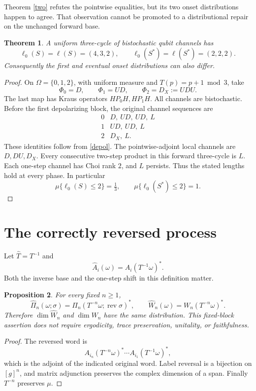 \documentclass[11pt,a4paper]{article}
\newtheorem{theorem}{Theorem}
\newtheorem{proposition}[theorem]{Proposition}
\begin{document}
Theorem \ref{two} refutes the pointwise equalities, but its two onset distributions happen to agree. That observation cannot be promoted to a distributional repair on the unchanged forward base.

\begin{theorem}\label{three}
A uniform three-cycle of bistochastic qubit channels has
\[
 \ell_0(S)=\ell(S)=(4,3,2),\qquad
 \ell_0(S^*)=\ell(S^*)=(2,2,2).
\]
Consequently the first and eventual onset distributions can also differ.
\end{theorem}
\begin{proof}
On $\Omega=\{0,1,2\}$, with uniform measure and $T(p)=p+1\bmod3$, take
\[
 \Phi_0=D,\qquad \Phi_1=UD,\qquad \Phi_2=D_X:=UDU.
\]
The last map has Kraus operators $HP_0H,HP_1H$. All channels are bistochastic. Before the first depolarizing block, the original channel sequences are
\[
 \begin{array}{c|l}
 0&D,\ UD,\ UD,\ L\\
 1&UD,\ UD,\ L\\
 2&D_X,\ L .
 \end{array}
\]
These identities follow from \eqref{depol}. The pointwise-adjoint local channels are $D,DU,D_X$. Every consecutive two-step product in this forward three-cycle is $L$. Each one-step channel has Choi rank $2$, and $L$ persists. Thus the stated lengths hold at every phase. In particular
\[
 \mu\{\ell_0(S)\leq2\}=\tfrac13,\qquad
 \mu\{\ell_0(S^*)\leq2\}=1.
\]
\end{proof}

\section{The correctly reversed process}
Let $\widehat T=T^{-1}$ and
\[
 \widehat A_i(\omega)=A_i(T^{-1}\omega)^*.
\]
Both the inverse base and the one-step shift in this definition matter.

\begin{proposition}\label{fixed}
For every fixed $n\geq1$,
\[
 \widehat\Pi_n(\omega;\sigma)
 =\Pi_n(T^{-n}\omega;\operatorname{rev}\sigma)^*,\qquad
 \widehat W_n(\omega)=W_n(T^{-n}\omega)^*.
\]
Therefore $\dim\widehat W_n$ and $\dim W_n$ have the same distribution. This fixed-block assertion does not require ergodicity, trace preservation, unitality, or faithfulness.
\end{proposition}
\begin{proof}
The reversed word is
\[
 A_{i_n}(T^{-n}\omega)^*\cdots A_{i_1}(T^{-1}\omega)^*,
\]
which is the adjoint of the indicated original word. Label reversal is a bijection on $[g]^n$, and matrix adjunction preserves the complex dimension of a span. Finally $T^{-n}$ preserves $\mu$.
\end{proof}
\end{document}
